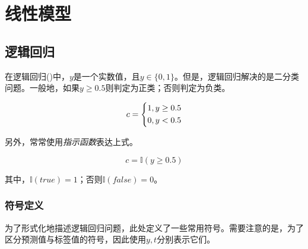 \begin{savequote}[45mm]
\end{savequote}

\chapter{线性模型} 
\label{ch:linear-model}

\section{逻辑回归}

\begin{content}

在逻辑回归()中，$y$是一个实数值，且$y \in \{ 0,1\}$。但是，逻辑回归解决的是二分类问题。一般地，如果$y \ge 0.5$则判定为正类；否则判定为负类。

\[c = \left\{ \begin{gathered}
  1,y \ge 0.5 \hfill \\
  0,y < 0.5 \hfill \\ 
\end{gathered}  \right.\]

另外，常常使用\emph{指示函数}表达上式。

\[
c = \mathbb I(y \ge 0.5)
\]

其中，$\mathbb I(true) = 1$；否则$\mathbb I(false) = 0$。

\subsection{符号定义}

为了形式化地描述逻辑回归问题，此处定义了一些常用符号。需要注意的是，为了区分预测值与标签值的符号，因此使用$y, t$分别表示它们。


\end{content}
